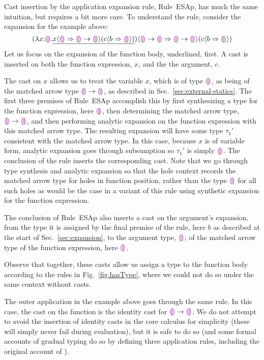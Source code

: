 Cast insertion by the application expansion rule, Rule~{ESAp}, has much the same intuition, but requires a bit more care. To understand the rule, consider the expansion for the example above:
\[\hap{\dcasttwo{(\halam{x}{\tehole}{\underline{\hap{\dcasttwo{x}{\tehole}{\tarr{\tehole}{\tehole}}}{\dcasttwo{c}{b}{\tehole}}}})}{\tarr{\tehole}{\tehole}}{\tarr{\tehole}{\tehole}}}{\dcasttwo{c}{b}{\tehole}}
\]
Let us focus on the expansion of the function body, underlined, first. A cast is inserted on both the function expression, $x$, and the the argument, $c$. 

The cast on $x$ allows us to treat the variable $x$, which is of type $\tehole$, as being of the matched arrow type $\tarr{\tehole}{\tehole}$, as described in Sec.~\ref{sec:external-statics}. The first three premises of Rule~{ESAp} accomplish this by first synthesizing a type for the function expression, here $\tehole$, then determining the matched arrow type, $\tarr{\tehole}{\tehole}$, and then performing analytic expansion on the function expression with this matched arrow type. The resulting expansion will have some type $\tau_1'$ consistent with the matched arrow type. In this case, because $x$ is of variable form, analytic expansion goes through subsumption so $\tau_1'$ is simply $\tehole$. The conclusion of the rule inserts the corresponding cast. Note that we go through type synthesis and analytic expansion so that the hole context records the matched arrow type for holes in function position, rather than the type $\tehole$ for all such holes as would be the case in a variant of this rule using synthetic expansion for the function expression.

The conclusion of Rule~{ESAp} also inserts a cast on the argument's expansion, from the type it is assigned by the final premise of the rule, here $b$ as described at the start of Sec.~\ref{sec:expansion}, to the argument type, $\tehole$, of the matched arrow type of the function expression, here $\tehole$.

Observe that together, these casts allow us assign a type to the function body according to the rules in Fig.~\ref{fig:hasType}, where we could not do so under the same context without casts.

The outer application in the example above goes through the same rule. In this case, the cast on the function is the identity cast for $\tarr{\tehole}{\tehole}$. We do not attempt to avoid the insertion of identity casts in the core calculus for simplicity (these will simply never fail during evaluation), but it is safe to do so (and some formal accounts of gradual typing do so by defining three application rules, including the original account of \cite{Siek06a}).


